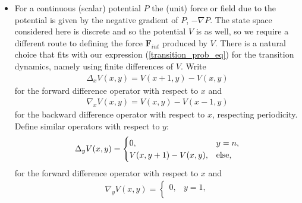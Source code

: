\documentclass[12pt,letterpaper]{article}
\newcommand{\mb}{\mathbf}
\newcommand{\mc}{\mathcal}
\begin{document}
\begin{itemize}
\begin{align*}
\mb{f}_{rand} \sim \sqrt{2\gamma m_{i} \over \beta}\boldsymbol{\eta}(t),
\end{align*}
where $\boldsymbol{\eta}(t)$ is a stationary Gaussian process satisfying
\begin{align*}
\langle \boldsymbol{\eta}(t) \rangle &= 0 \\
\langle \boldsymbol{\eta}(t)\boldsymbol{\eta}(t') \rangle &= \delta(t - t')
\end{align*}
for $\delta$ the Dirac delta function. Then
\begin{align*}
W^{rand}_{\mc{P}} = \mb{f}_{rand} \cdot \Delta\mb{r},
\end{align*}
where $\Delta\mb{r}$ is the displacement from $\mb{r}_{i}^{(t)}$ to $\mb{r}_{i}^{(t+1)}$. Summing, we have
\begin{align*}
W_{\mc{P}} = W^{rand}_{\mc{P}} + W^{ext}_{\mc{P}} = \mb{f}_{rand} \cdot \Delta\mb{r} + \sum_{j=1}^{m-1}\mb{F}_{ext}(\mb{r}_{j}, t) \cdot \Delta\mb{r}_{j}.
\end{align*}
\item For a continuous (scalar) potential $P$ the (unit) force or field due to the potential is given by the negative gradient of $P$, $-\nabla P$. The state space considered here is discrete and so the potential $V$ is as well, so we require a different route to defining the force $\mb{F}_{int}$ produced by $V$. There is a natural choice that fits with our expression (\ref{transition_prob_eq}) for the transition dynamics, namely using finite differences of $V$. Write
\begin{align*}
\Delta_{x}V(x, y) = V(x+1, y) - V(x, y)
\end{align*}
for the forward difference operator with respect to $x$ and
\begin{align*}
\nabla_{x}V(x, y) = V(x, y) - V(x-1, y)
\end{align*}
for the backward difference operator with respect to $x$, respecting periodicity. Define similar operators with respect to $y$:
\begin{align*}
\Delta_{y}V(x, y) = \begin{cases}
0, &y = n, \\
V(x, y+1) - V(x, y),  &\textnormal{else,}
\end{cases}
\end{align*}
for the forward difference operator with respect to $x$ and
\begin{align*}
\nabla_{y}V(x, y) = \begin{cases}
0, &y = 1, \\

\end{cases}
\end{align*}
\end{itemize}
\end{document}

